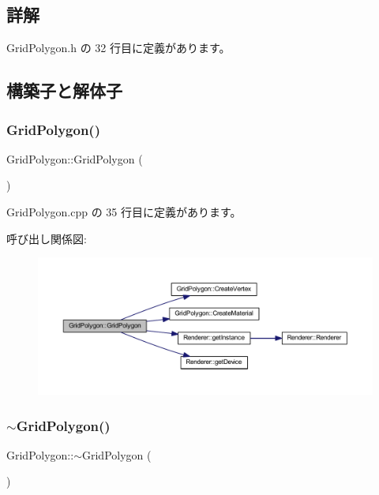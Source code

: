 \subsection{詳解}


 Grid\+Polygon.\+h の 32 行目に定義があります。



\subsection{構築子と解体子}
\mbox{\label{class_grid_polygon_a4fdbbc978d24c751b07c6803eb53075e}} 
\subsubsection{\texorpdfstring{Grid\+Polygon()}{GridPolygon()}}
{\footnotesize\ttfamily Grid\+Polygon\+::\+Grid\+Polygon (\begin{DoxyParamCaption}{ }\end{DoxyParamCaption})}



 Grid\+Polygon.\+cpp の 35 行目に定義があります。

呼び出し関係図\+:
\nopagebreak
\begin{figure}[H]
\begin{center}
\leavevmode
\includegraphics[width=350pt]{class_grid_polygon_a4fdbbc978d24c751b07c6803eb53075e_cgraph}
\end{center}
\end{figure}
\mbox{\label{class_grid_polygon_a25fbe0d5c2682a1174dda7d29f6ddf74}} 
\subsubsection{\texorpdfstring{$\sim$\+Grid\+Polygon()}{~GridPolygon()}}
{\footnotesize\ttfamily Grid\+Polygon\+::$\sim$\+Grid\+Polygon (\begin{DoxyParamCaption}{ }\end{DoxyParamCaption})}



